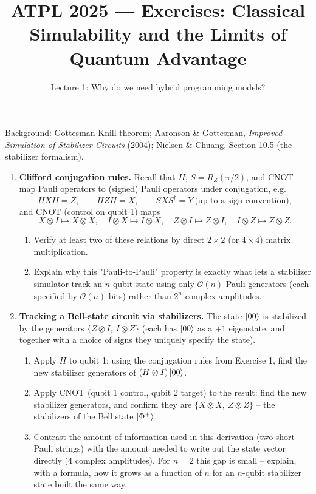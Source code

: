 \documentclass[11pt]{article}
\title{ATPL 2025 --- Exercises: Classical Simulability and the Limits of
Quantum Advantage}
\author{Lecture 1: Why do we need hybrid programming models?}
\date{}
\begin{document}
\maketitle

Background: Gottesman-Knill theorem; Aaronson \& Gottesman,
\emph{Improved Simulation of Stabilizer Circuits} (2004); Nielsen \&
Chuang, Section 10.5 (the stabilizer formalism).

\begin{enumerate}[label=\textbf{Exercise \arabic*.}, leftmargin=2.2cm]

\item \textbf{Clifford conjugation rules.}
Recall that $H$, $S=R_Z(\pi/2)$, and CNOT map Pauli operators to
(signed) Pauli operators under conjugation, e.g.
\[
HXH = Z, \qquad HZH = X, \qquad SXS^\dagger = Y \ \text{(up to a sign
convention)},
\]
and CNOT (control on qubit 1) maps
\[
X\otimes I \mapsto X\otimes X, \quad
I\otimes X \mapsto I\otimes X, \quad
Z\otimes I \mapsto Z\otimes I, \quad
I\otimes Z \mapsto Z\otimes Z.
\]
\begin{enumerate}[label=(\alph*)]
\item Verify at least two of these relations by direct $2\times2$ (or
$4\times4$) matrix multiplication.
\item Explain why this "Pauli-to-Pauli" property is exactly what lets a
stabilizer simulator track an $n$-qubit state using only $\mathcal O(n)$
Pauli generators (each specified by $\mathcal O(n)$ bits) rather than
$2^n$ complex amplitudes.
\end{enumerate}

\item \textbf{Tracking a Bell-state circuit via stabilizers.}
The state $\ket{00}$ is stabilized by the generators
$\{Z\otimes I,\ I\otimes Z\}$ (each has $\ket{00}$ as a $+1$
eigenstate, and together with a choice of signs they uniquely specify
the state).
\begin{enumerate}[label=(\alph*)]
\item Apply $H$ to qubit 1: using the conjugation rules from Exercise 1,
find the new stabilizer generators of $(H\otimes I)\ket{00}$.
\item Apply CNOT (qubit 1 control, qubit 2 target) to the result: find
the new stabilizer generators, and confirm they are
$\{X\otimes X,\ Z\otimes Z\}$ -- the stabilizers of the Bell state
$\ket{\Phi^+}$.
\item Contrast the amount of information used in this derivation (two
short Pauli strings) with the amount needed to write out the state
vector directly (4 complex amplitudes). For $n=2$ this gap is small --
explain, with a formula, how it grows as a function of $n$ for an
$n$-qubit stabilizer state built the same way.
\end{enumerate}


\end{enumerate}
\end{document}

